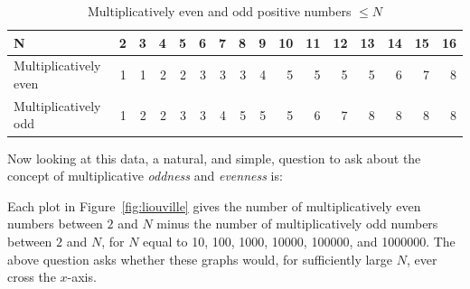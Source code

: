 \documentclass[11pt]{article}
\theoremstyle{plain}
\theoremstyle{definition}
\numberwithin{equation}{section}
\numberwithin{figure}{section}
\numberwithin{table}{section}
\begin{document}
  \begin{table}[H] \caption{Multiplicatively even and odd positive numbers $\le N$\label{tab:evenodddata}}
  \begin{center}
 
\begin{tabular}{|l|r|r|r|r|r|r|r|r|r|r|r|r|r|r|r|}
\hline
N & 2 & 3 & 4 & 5  & 6 & 7 & 8 & 9 & 10 & 11 & 12 & 13 & 14 & 15 & 16  \\ \hline
Multiplicatively even & 1 & 1 & 2 & 2  & 3 & 3 & 3 & 4 & 5 & 5 & 5 & 5 & 6 & 7 & 8 \\ \hline
Multiplicatively odd & 1 & 2 & 2 & 3  & 3 & 4 & 5 & 5 & 5 & 6 & 7 & 8 & 8 & 8 & 8 \\ \hline
\end{tabular}
\end{center}
\end{table}

  
   Now looking at this data, a natural, and simple, question to ask about the concept of multiplicative {\em oddness} and {\em evenness} is: 
   

Each plot in Figure~\ref{fig:liouville} gives the number of
multiplicatively even numbers between $2$ and $N$ minus the number of
multiplicatively odd numbers between $2$ and $N$, for $N$ equal to 10,
100, 1000, 10000, 100000, and 1000000. The above question asks whether these graphs
would, for sufficiently large $N$, ever cross the $x$-axis.
\end{document}
